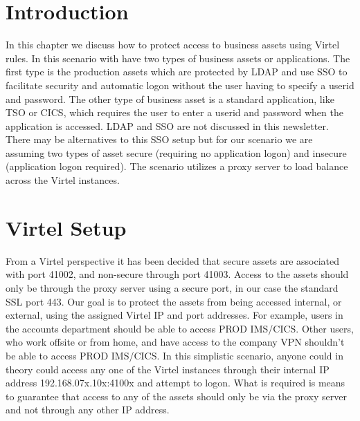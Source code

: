 \documentclass[letterpaper,10pt,english]{sphinxmanual}
\begin{document}
\section{Introduction}
\label{\detokenize{connectivity_guide:id76}}
In this chapter we discuss how to protect access to business assets using Virtel rules. In this scenario with have two types of business assets or applications. The first type is the production assets which are protected by LDAP and use SSO to facilitate security and automatic logon without the user having to specify a userid and password. The other type of business asset is a standard application, like TSO or CICS, which requires the user to enter a userid and password when the application is accessed. LDAP and SSO are not discussed in this newsletter. There may be alternatives to this SSO setup but for our scenario we are assuming two types of asset \textendash{} secure (requiring no application logon) and insecure (application logon required). The scenario utilizes a proxy server to load balance across the Virtel instances.


\newpage


\section{Virtel Setup}
\label{\detokenize{connectivity_guide:index-178}}\label{\detokenize{connectivity_guide:virtel-setup}}
From a Virtel perspective it has been decided that secure assets are associated with port 41002, and non-secure through port 41003. Access to the assets should only be through the proxy server using a secure port, in our case the standard SSL port 443. Our goal is to protect the assets from being accessed internal, or external, using the assigned Virtel IP
and port addresses. For example, users in the accounts department should be able to access PROD IMS/CICS. Other users, who work offsite or from home, and have access to the company VPN shouldn’t be able to access PROD IMS/CICS. In this simplistic scenario, anyone could in theory could access any one of the Virtel instances through their internal IP address \textendash{} 192.168.07x.10x:4100x and attempt to logon. What is required is means to guarantee that access to any of the assets should only be via the proxy server and not through any other IP address.
\end{document}
